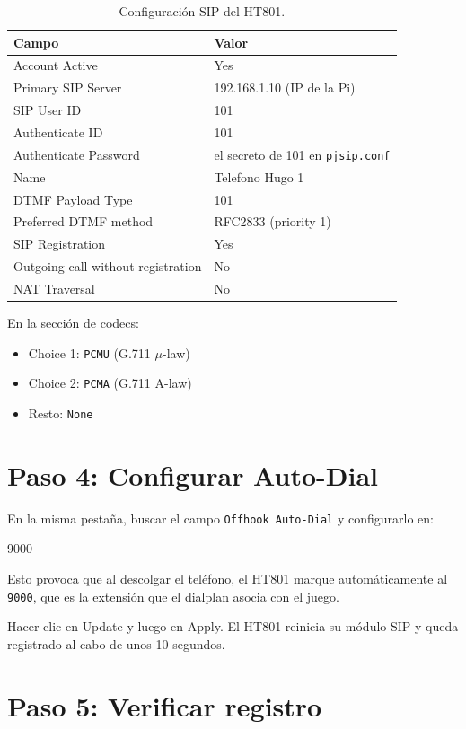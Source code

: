\begin{table}[h]
\centering
\begin{tabular}{ll}
\toprule
\textbf{Campo} & \textbf{Valor} \\
\midrule
Account Active & Yes \\
Primary SIP Server & 192.168.1.10 (IP de la Pi) \\
SIP User ID & 101 \\
Authenticate ID & 101 \\
Authenticate Password & el secreto de 101 en \texttt{pjsip.conf} \\
Name & Telefono Hugo 1 \\
DTMF Payload Type & 101 \\
Preferred DTMF method & RFC2833 (priority 1) \\
SIP Registration & Yes \\
Outgoing call without registration & No \\
NAT Traversal & No \\
\bottomrule
\end{tabular}
\caption{Configuración SIP del HT801.}
\end{table}

En la sección de codecs:

\begin{itemize}
  \item Choice 1: \texttt{PCMU} (G.711 $\mu$-law)
  \item Choice 2: \texttt{PCMA} (G.711 A-law)
  \item Resto: \texttt{None}
\end{itemize}

\section{Paso 4: Configurar Auto-Dial}

En la misma pestaña, buscar el campo \texttt{Offhook Auto-Dial} y configurarlo en:

\begin{plaincode}
9000
\end{plaincode}

Esto provoca que al descolgar el teléfono, el HT801 marque automáticamente al \texttt{9000}, que es la extensión que el dialplan asocia con el juego.

Hacer clic en \textsf{Update} y luego en \textsf{Apply}. El HT801 reinicia su módulo SIP y queda registrado al cabo de unos 10 segundos.

\section{Paso 5: Verificar registro}

